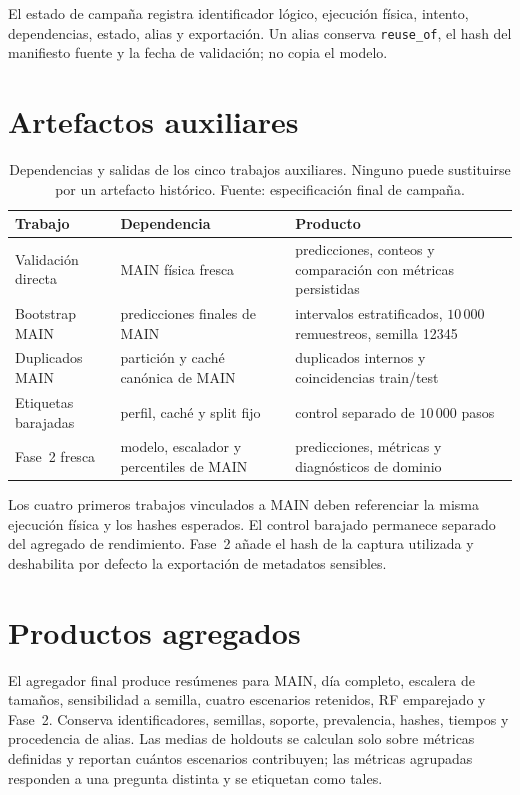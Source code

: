 El estado de campaña registra identificador lógico, ejecución física, intento, dependencias, estado, alias y exportación. Un alias conserva \texttt{reuse\_of}, el hash del manifiesto fuente y la fecha de validación; no copia el modelo.

\section{Artefactos auxiliares}

\begin{table}[htbp]
\centering
\footnotesize
\begin{tabular}{p{3.5cm}p{5.1cm}p{3.4cm}}
\toprule
Trabajo & Dependencia & Producto \\
\midrule
Validación directa & MAIN física fresca & predicciones, conteos y comparación con métricas persistidas \\
Bootstrap MAIN & predicciones finales de MAIN & intervalos estratificados, $10\,000$ remuestreos, semilla 12345 \\
Duplicados MAIN & partición y caché canónica de MAIN & duplicados internos y coincidencias train/test \\
Etiquetas barajadas & perfil, caché y split fijo & control separado de $10\,000$ pasos \\
Fase~2 fresca & modelo, escalador y percentiles de MAIN & predicciones, métricas y diagnósticos de dominio \\
\bottomrule
\end{tabular}
\caption[Trabajos auxiliares de la campaña]{Dependencias y salidas de los cinco trabajos auxiliares. Ninguno puede sustituirse por un artefacto histórico. Fuente: especificación final de campaña.}
\label{tab:auxiliares-campana}
\end{table}

Los cuatro primeros trabajos vinculados a MAIN deben referenciar la misma ejecución física y los hashes esperados. El control barajado permanece separado del agregado de rendimiento. Fase~2 añade el hash de la captura utilizada y deshabilita por defecto la exportación de metadatos sensibles.

\section{Productos agregados}

El agregador final produce resúmenes para MAIN, día completo, escalera de tamaños, sensibilidad a semilla, cuatro escenarios retenidos, RF emparejado y Fase~2. Conserva identificadores, semillas, soporte, prevalencia, hashes, tiempos y procedencia de alias. Las medias de holdouts se calculan solo sobre métricas definidas y reportan cuántos escenarios contribuyen; las métricas agrupadas responden a una pregunta distinta y se etiquetan como tales.


